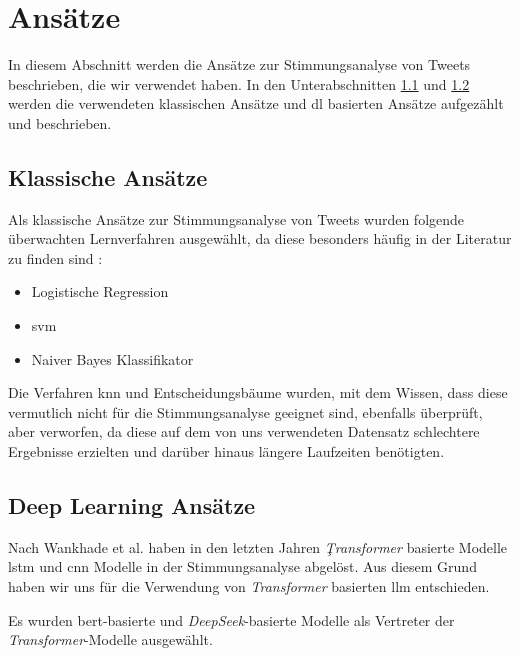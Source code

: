 \section{Ansätze}

In diesem Abschnitt werden die Ansätze zur Stimmungsanalyse von Tweets beschrieben, die wir verwendet haben.
In den Unterabschnitten \ref{subsec:klassische-ansaetze} und \ref{subsec:deep-learning-ansaetze} werden die verwendeten klassischen Ansätze und \gls{dl} basierten Ansätze aufgezählt und beschrieben.

\subsection{Klassische Ansätze}\label{subsec:klassische-ansaetze}

Als klassische Ansätze zur Stimmungsanalyse von Tweets wurden folgende überwachten Lernverfahren ausgewählt, da diese besonders häufig in der Literatur zu finden sind \cite{medhat2014sentiment, wankhade2022survey, zimbra2018state}:

\begin{itemize}
    \item Logistische Regression
    \item \gls{svm}
    \item Naiver Bayes Klassifikator
\end{itemize}

Die Verfahren \gls{knn} und Entscheidungsbäume wurden, mit dem Wissen, dass diese vermutlich nicht für die Stimmungsanalyse geeignet sind, ebenfalls überprüft, aber verworfen, da diese auf dem von uns verwendeten Datensatz schlechtere Ergebnisse erzielten und darüber hinaus längere Laufzeiten benötigten.

\subsection{Deep Learning Ansätze}\label{subsec:deep-learning-ansaetze}

Nach Wankhade et al. \cite{wankhade2022survey} haben in den letzten Jahren \textit{Ţransformer} basierte Modelle \gls{lstm} und \gls{cnn} Modelle in der Stimmungsanalyse abgelöst.
Aus diesem Grund haben wir uns für die Verwendung von \textit{Transformer} basierten \gls{llm} entschieden.

Es wurden \gls{bert}-basierte und \textit{DeepSeek}-basierte Modelle als Vertreter der \textit{Transformer}-Modelle ausgewählt.

